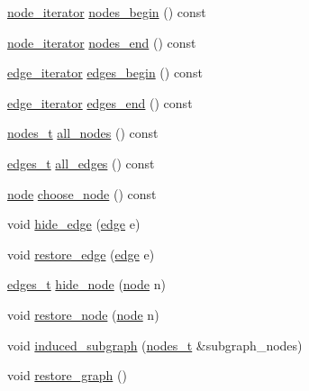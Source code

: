 \begin{DoxyCompactItemize}
\item 
\mbox{\hyperlink{classgraph_a2cb374b84c133ce13f94e73c3e5da7fa}{node\+\_\+iterator}} \mbox{\hyperlink{classgraph_aec053a4b509d1be804237a80044c54c0}{nodes\+\_\+begin}} () const
\item 
\mbox{\hyperlink{classgraph_a2cb374b84c133ce13f94e73c3e5da7fa}{node\+\_\+iterator}} \mbox{\hyperlink{classgraph_abbf9c0cb5629e98e1142254911238173}{nodes\+\_\+end}} () const
\item 
\mbox{\hyperlink{classgraph_a818d3766018eb0af91d520ce2150203c}{edge\+\_\+iterator}} \mbox{\hyperlink{classgraph_a7ba35a4c4e8343ffb27ed6d9703c6f18}{edges\+\_\+begin}} () const
\item 
\mbox{\hyperlink{classgraph_a818d3766018eb0af91d520ce2150203c}{edge\+\_\+iterator}} \mbox{\hyperlink{classgraph_aea8d7f976b85b6137f52d915e26639f6}{edges\+\_\+end}} () const
\item 
\mbox{\hyperlink{edge_8h_a22ac17689106ba21a84e7bc54d1199d6}{nodes\+\_\+t}} \mbox{\hyperlink{classgraph_a268af566b8df2cbaede1319ad370dc7e}{all\+\_\+nodes}} () const
\item 
\mbox{\hyperlink{edge_8h_a8f9587479bda6cf612c103494b3858e3}{edges\+\_\+t}} \mbox{\hyperlink{classgraph_aa0c7027e0cc7430b77ab9629eecefd3f}{all\+\_\+edges}} () const
\item 
\mbox{\hyperlink{classnode}{node}} \mbox{\hyperlink{classgraph_aec5c11c90a94ebd145f059a541db860e}{choose\+\_\+node}} () const
\item 
void \mbox{\hyperlink{classgraph_ab2f8520bcac080d73c55228fecc61825}{hide\+\_\+edge}} (\mbox{\hyperlink{classedge}{edge}} e)
\item 
void \mbox{\hyperlink{classgraph_a2e5426682a0897b9f9104b019970bedc}{restore\+\_\+edge}} (\mbox{\hyperlink{classedge}{edge}} e)
\item 
\mbox{\hyperlink{edge_8h_a8f9587479bda6cf612c103494b3858e3}{edges\+\_\+t}} \mbox{\hyperlink{classgraph_a214618b5e3c02695779350532506e225}{hide\+\_\+node}} (\mbox{\hyperlink{classnode}{node}} n)
\item 
void \mbox{\hyperlink{classgraph_ab57aab79e649cc275052b7decbdd03ec}{restore\+\_\+node}} (\mbox{\hyperlink{classnode}{node}} n)
\item 
void \mbox{\hyperlink{classgraph_a15b766094bb0b97ef53e06e7c26b2197}{induced\+\_\+subgraph}} (\mbox{\hyperlink{edge_8h_a22ac17689106ba21a84e7bc54d1199d6}{nodes\+\_\+t}} \&subgraph\+\_\+nodes)
\item 
void \mbox{\hyperlink{classgraph_a53e2a5505fa6427587e12d66e4a86cec}{restore\+\_\+graph}} ()

\end{DoxyCompactItemize}
